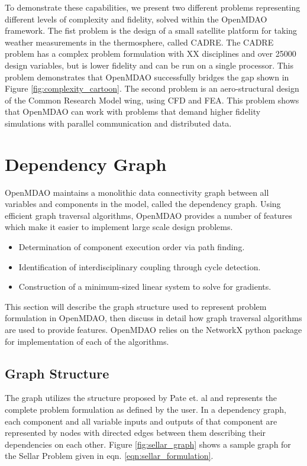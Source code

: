 \documentclass[]{aiaa-tc} %
\begin{document}
    To demonstrate these capabilities, we present two different problems representing different levels of
    complexity and fidelity, solved within the OpenMDAO framework. The fist problem is the design of a small
    satellite platform for taking weather measurements in the thermosphere, called CADRE. The CADRE problem has a
    complex problem formulation with XX disciplines and over 25000 design variables, but is lower fidelity and can
    be run on a single processor. This problem demonstrates that OpenMDAO successfully bridges the gap shown
    in Figure \ref{fig:complexity_cartoon}. The second problem is an aero-structural design of the Common Research
    Model wing, using CFD and FEA. This problem shows that OpenMDAO can work with problems that demand higher fidelity
    simulations with parallel communication and distributed data.

  \section{Dependency Graph}

    OpenMDAO maintains a monolithic data connectivity graph between all 
    variables and components in the model, called the dependency graph.
    Using efficient graph traversal algorithms, OpenMDAO provides a number of
    features which make it easier to implement large scale design problems.

    \begin{itemize}
      \item Determination of component execution order via path finding.
      \item Identification of interdisciplinary coupling through cycle detection.
      \item Construction of a minimum-sized linear system to solve for gradients.
    \end{itemize}

    This section will describe the graph structure used to represent problem formulation in OpenMDAO,
    then discuss in detail how graph traversal algorithms are used to provide features. OpenMDAO relies
    on the NetworkX \cite{hagberg-2008-exploring} python package for implementation of each of 
    the algorithms. 
      

    \subsection{Graph Structure}
    The graph utilizes the structure proposed by 
    Pate et. al \cite{graph_problem2013} and represents the complete problem formulation as 
    defined by the user. In a dependency graph, each component and all variable inputs and outputs of that component are 
    represented by nodes with directed edges between them describing their dependencies on each other. 
    Figure \ref{fig:sellar_graph} shows a sample graph for the Sellar Problem \cite{AIAA:sellar} 
    given in eqn. \ref{eqn:sellar_formulation}.  
\end{document}
